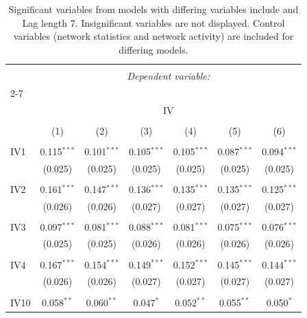 
\begin{table}[!htbp] \centering 
  \caption{Significant variables from models with differing variables include 
                               and Lag length 7. Insignificant variables are not displayed. 
                               Control variables (network statistics and network activity) are 
                               included for differing models.} 
  \label{IVmodels1_5min_t} 
\scriptsize 
\begin{tabular}{@{\extracolsep{5pt}}lcccccc} 
\\[-1.8ex]\hline 
\hline \\[-1.8ex] 
 & \multicolumn{6}{c}{\textit{Dependent variable:}} \\ 
\cline{2-7} 
\\[-1.8ex] & \multicolumn{6}{c}{IV} \\ 
\\[-1.8ex] & (1) & (2) & (3) & (4) & (5) & (6)\\ 
\hline \\[-1.8ex] 
 IV1 & 0.115$^{***}$ & 0.101$^{***}$ & 0.105$^{***}$ & 0.105$^{***}$ & 0.087$^{***}$ & 0.094$^{***}$ \\ 
  & (0.025) & (0.025) & (0.025) & (0.025) & (0.025) & (0.025) \\ 
  & & & & & & \\ 
 IV2 & 0.161$^{***}$ & 0.147$^{***}$ & 0.136$^{***}$ & 0.135$^{***}$ & 0.135$^{***}$ & 0.125$^{***}$ \\ 
  & (0.026) & (0.026) & (0.027) & (0.027) & (0.027) & (0.027) \\ 
  & & & & & & \\ 
 IV3 & 0.097$^{***}$ & 0.081$^{***}$ & 0.088$^{***}$ & 0.081$^{***}$ & 0.075$^{***}$ & 0.076$^{***}$ \\ 
  & (0.025) & (0.025) & (0.026) & (0.026) & (0.026) & (0.026) \\ 
  & & & & & & \\ 
 IV4 & 0.167$^{***}$ & 0.154$^{***}$ & 0.149$^{***}$ & 0.152$^{***}$ & 0.145$^{***}$ & 0.144$^{***}$ \\ 
  & (0.026) & (0.026) & (0.027) & (0.027) & (0.027) & (0.027) \\ 
  & & & & & & \\ 
 IV10 & 0.058$^{**}$ & 0.060$^{**}$ & 0.047$^{*}$ & 0.052$^{**}$ & 0.055$^{**}$ & 0.050$^{*}$ \\ 

\end{tabular}
\end{table}
